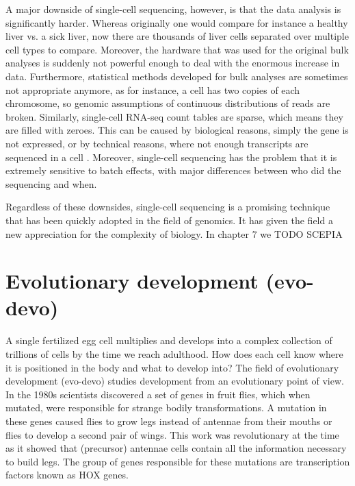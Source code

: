 A major downside of single-cell sequencing, however, is that the data analysis is significantly harder. Whereas originally one would compare for instance a healthy liver vs. a sick liver, now there are thousands of liver cells separated over multiple cell types to compare. Moreover, the hardware that was used for the original bulk analyses is suddenly not powerful enough to deal with the enormous increase in data. Furthermore, statistical methods developed for bulk analyses are sometimes not appropriate anymore, as for instance, a cell has two copies of each chromosome, so genomic assumptions of continuous distributions of reads are broken. Similarly, single-cell RNA-seq count tables are sparse, which means they are filled with zeroes. This can be caused by biological reasons, simply the gene is not expressed, or by technical reasons, where not enough transcripts are sequenced in a cell \cite{Jiang2022}. Moreover, single-cell sequencing has the problem that it is extremely sensitive to batch effects, with major differences between who did the sequencing and when.

Regardless of these downsides, single-cell sequencing is a promising technique that has been quickly adopted in the field of genomics. It has given the field a new appreciation for the complexity of biology. In chapter 7 we TODO SCEPIA

\section{Evolutionary development (evo-devo)}

A single fertilized egg cell multiplies and develops into a complex collection of trillions of cells by the time we reach adulthood. How does each cell know where it is positioned in the body and what to develop into? The field of evolutionary development (evo-devo) studies development from an evolutionary point of view. In the 1980s scientists discovered a set of genes in fruit flies, which when mutated, were responsible for strange bodily transformations. A mutation in these genes caused flies to grow legs instead of antennae from their mouths\cite{Schneuwly1987} or flies to develop a second pair of wings\cite{Weatherbee1998}. This work was revolutionary at the time as it showed that (precursor) antennae cells contain all the information necessary to build legs. The group of genes responsible for these mutations are transcription factors known as HOX genes.

